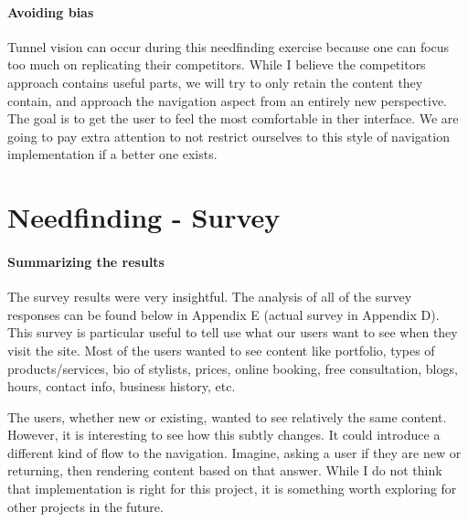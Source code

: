 \paragraph{Avoiding bias}
Tunnel vision can occur during this needfinding exercise because one can focus too much on replicating their competitors. While I believe the competitors approach contains useful parts, we will try to only retain the content they contain, and approach the navigation aspect from an entirely new perspective. The goal is to get the user to feel the most comfortable in ther interface. We are going to pay extra attention to not restrict ourselves to this style of navigation implementation if a better one exists.


\section{Needfinding - Survey}

\paragraph{Summarizing the results}
The survey results were very insightful. The analysis of all of the survey responses can be found below in Appendix E (actual survey in Appendix D). This survey is particular useful to tell use what our users want to see when they visit the site. Most of the users wanted to see content like portfolio, types of products/services, bio of stylists, prices, online booking, free consultation, blogs, hours, contact info, business history, etc.

The users, whether new or existing, wanted to see relatively the same content. However, it is interesting to see how this subtly changes. It could introduce a different kind of flow to the navigation. Imagine, asking a user if they are new or returning, then rendering content based on that answer. While I do not think that implementation is right for this project, it is something worth exploring for other projects in the future.

